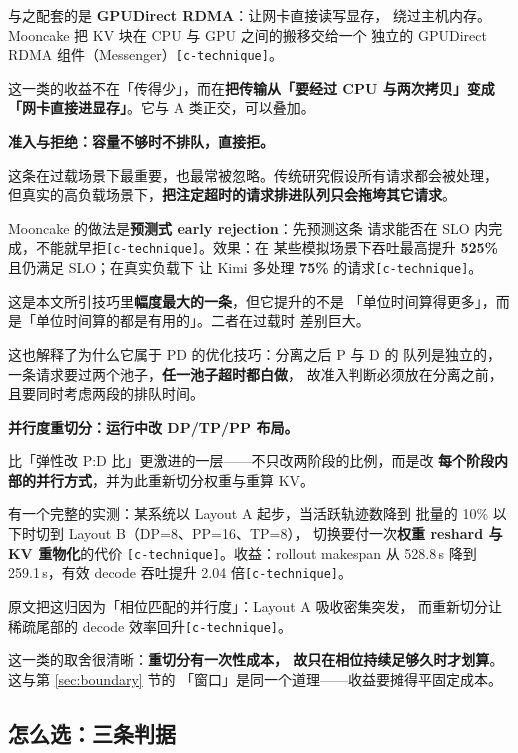 \noindent 与之配套的是 \textbf{GPUDirect RDMA}：让网卡直接读写显存，
绕过主机内存。Mooncake 把 KV 块在 CPU 与 GPU 之间的搬移交给一个
独立的 GPUDirect RDMA 组件（Messenger）\texttt{[c-technique]}。

\noindent 这一类的收益不在「传得少」，而在\textbf{把传输从「要经过
CPU 与两次拷贝」变成「网卡直接进显存」}。它与 A 类正交，可以叠加。

\noindent\textbf{ 准入与拒绝：容量不够时不排队，直接拒。}

这条在过载场景下最重要，也最常被忽略。传统研究假设所有请求都会被处理，
但真实的高负载场景下，\textbf{把注定超时的请求排进队列只会拖垮其它请求}。

\noindent Mooncake 的做法是\textbf{预测式 early rejection}：先预测这条
请求能否在 SLO 内完成，不能就早拒\texttt{[c-technique]}。效果：在
某些模拟场景下吞吐最高提升 \textbf{525\%} 且仍满足 SLO；在真实负载下
让 Kimi 多处理 \textbf{75\%} 的请求\texttt{[c-technique]}。

\noindent 这是本文所引技巧里\textbf{幅度最大的一条}，但它提升的不是
「单位时间算得更多」，而是「单位时间算的都是有用的」。二者在过载时
差别巨大。

\noindent 这也解释了为什么它属于 PD 的优化技巧：分离之后 P 与 D 的
队列是独立的，一条请求要过两个池子，\textbf{任一池子超时都白做}，
故准入判断必须放在分离之前，且要同时考虑两段的排队时间。

\noindent\textbf{ 并行度重切分：运行中改 DP/TP/PP 布局。}

比「弹性改 P:D 比」更激进的一层——不只改两阶段的比例，而是改
\textbf{每个阶段内部的并行方式}，并为此重新切分权重与重算 KV。

\noindent 有一个完整的实测：某系统以 Layout A 起步，当活跃轨迹数降到
批量的 10\% 以下时切到 Layout B（DP=8、PP=16、TP=8），
切换要付一次\textbf{权重 reshard 与 KV 重物化}的代价
\texttt{[c-technique]}。收益：rollout makespan 从 528.8\,s 降到
259.1\,s，有效 decode 吞吐提升 2.04 倍\texttt{[c-technique]}。

\noindent 原文把这归因为「相位匹配的并行度」：Layout A 吸收密集突发，
而重新切分让稀疏尾部的 decode 效率回升\texttt{[c-technique]}。

\noindent 这一类的取舍很清晰：\textbf{重切分有一次性成本，
故只在相位持续足够久时才划算}。这与第 \ref{sec:boundary} 节的
「窗口」是同一个道理——收益要摊得平固定成本。

\subsection{怎么选：三条判据}

